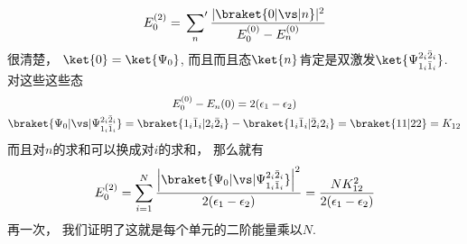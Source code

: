 \begin{align}
E_0^{(2)} = \sideset{}{'}\sum_n \frac{|\braket{0|\vs|n}|^2}{E_0^{(0)}-E_n^{(0)}}
\end{align}
很清楚，
$\ket{0}=\ket{\Psi_0}$,
而且而且态$\ket{n}$肯定是双激发$\ket{\Psi_{1_i\bar{1}_i}^{2_i\bar{2}_i}}$. 
对这些这些态
\begin{subequations}
	\begin{gather}
	E_0^{(0)} - E_n{(0)} = 2(\epsilon_1 - \epsilon_2)
	\label{6.83a}\\
	\braket{\Psi_0|\vs|\Psi_{1_i\bar{1}_i}^{2_i\bar{2}_i}} = \braket{1_i\bar{1}_i | 2_i\bar{2}_i} - \braket{1_i\bar{1}_i|\bar{2}_i2_i} = \braket{11|22}=K_{12}
	\label{6.83b}
\end{gather}
\end{subequations}
而且对$n$的求和可以换成对$i$的求和，
那么就有
\begin{align}
E_0^{(2)} = \sum_{i=1}^{N} \frac{\left|\braket{\Psi_0|\vs|\Psi_{1_i\bar{1}_i}^{2_i\bar{2}_i}}\right|^2}{2(\epsilon_1-\epsilon_2)} = \frac{NK_{12}^2}{2(\epsilon_1-\epsilon_2)}
\end{align}
再一次，
我们证明了这就是每个单元的二阶能量乘以$N$.


